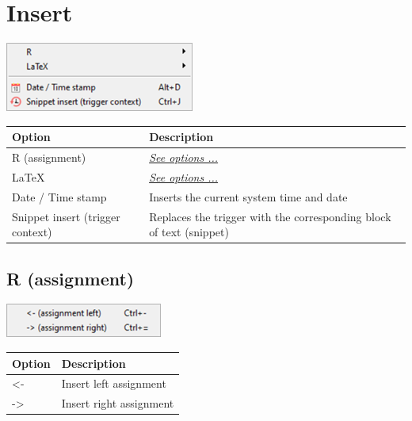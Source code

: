 
\hypertarget{menu_insert}{}
\section{Insert}

\includegraphics[scale=0.50]{./res/menu_insert.png}\\

\begin{scriptsize}
  \begin{tabularx}{\textwidth}{>{\hsize=0.3\hsize}X>{\hsize=0.7\hsize}X}\\
    \hline
    \textbf{Option} & \textbf{Description} \\
    \hline
    R (assignment) & \textit{\href{\#menu\_insert\_r}{See options ...}} \\
    \LaTeX & \textit{\href{\#menu\_insert\_latex}{See options ...}} \\
    \hdashline[1pt/1pt]
    Date / Time stamp & Inserts the current system time and date \\
    Snippet insert (trigger context) & Replaces the trigger with the corresponding block of text (snippet) \\
    \hline
  \end{tabularx}
\end{scriptsize}


\hypertarget{menu_insert_r}{}
\subsection{R (assignment)}

\includegraphics[scale=0.50]{./res/menu_insert_r_assignment.png}\\

\begin{scriptsize}
  \begin{tabularx}{\textwidth}{>{\hsize=0.3\hsize}X>{\hsize=0.7\hsize}X}\\
    \hline
    \textbf{Option} & \textbf{Description} \\
    \hline
    <- & Insert left assignment \\
    -> & Insert right assignment \\
    \hline
  \end{tabularx}
\end{scriptsize}


